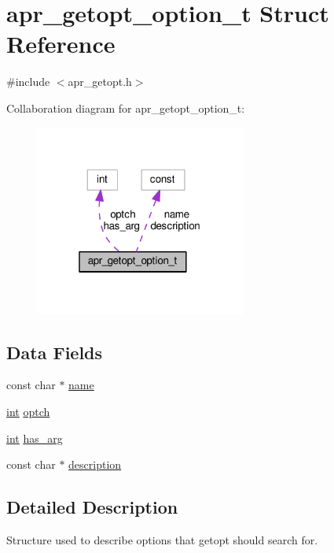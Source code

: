 \hypertarget{structapr__getopt__option__t}{}\section{apr\+\_\+getopt\+\_\+option\+\_\+t Struct Reference}
\label{structapr__getopt__option__t}


{\ttfamily \#include $<$apr\+\_\+getopt.\+h$>$}



Collaboration diagram for apr\+\_\+getopt\+\_\+option\+\_\+t\+:
\nopagebreak
\begin{figure}[H]
\begin{center}
\leavevmode
\includegraphics[width=196pt]{structapr__getopt__option__t__coll__graph}
\end{center}
\end{figure}
\subsection*{Data Fields}
\begin{DoxyCompactItemize}
\item 
const char $\ast$ \hyperlink{structapr__getopt__option__t_a7e623913c9761495c5d37adf6ff1ee69}{name}
\item 
\hyperlink{pcre_8txt_a42dfa4ff673c82d8efe7144098fbc198}{int} \hyperlink{structapr__getopt__option__t_a476e67c4dde620fe5b4f5952238c6e94}{optch}
\item 
\hyperlink{pcre_8txt_a42dfa4ff673c82d8efe7144098fbc198}{int} \hyperlink{structapr__getopt__option__t_aac65dae93f6d35f4848b91f6f9d66278}{has\+\_\+arg}
\item 
const char $\ast$ \hyperlink{structapr__getopt__option__t_a8fd515c0a9e621f6c0d058772429ab98}{description}
\end{DoxyCompactItemize}


\subsection{Detailed Description}
Structure used to describe options that getopt should search for. 

